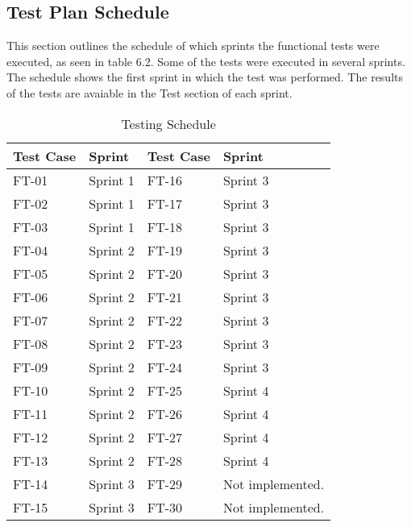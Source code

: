 \subsection*{Test Plan Schedule}

This section outlines the schedule of which sprints the functional tests were executed, as seen in table 6.2. Some of the tests were executed in several sprints. The schedule shows the first sprint in which the test was performed. The results of the tests are avaiable in the Test section of each sprint.


\begin{table}[h]
\centering
\begin{tabular}{| l | l || l | l |}
	\rowcolor{lightgray}
	\hline
	{\bf Test Case} & {\bf Sprint} & {\bf Test Case} & {\bf Sprint} \\ \hline
	FT-01 & Sprint 1 & FT-16 & Sprint 3 \\ \hline
	FT-02 & Sprint 1 & FT-17 & Sprint 3 \\ \hline
	FT-03 & Sprint 1 & FT-18 & Sprint 3 \\ \hline
	FT-04 & Sprint 2 & FT-19 & Sprint 3	\\ \hline
	FT-05 & Sprint 2 & FT-20 & Sprint 3 \\ \hline
	FT-06 & Sprint 2 & FT-21 & Sprint 3 \\ \hline
	FT-07 & Sprint 2 & FT-22 & Sprint 3	\\ \hline
	FT-08 & Sprint 2 & FT-23 & Sprint 3 \\ \hline
	FT-09 & Sprint 2 & FT-24 & Sprint 3 \\ \hline
	FT-10 & Sprint 2 & FT-25 & Sprint 4 \\ \hline
	FT-11 & Sprint 2 & FT-26 & Sprint 4 \\ \hline
	FT-12 & Sprint 2 & FT-27 & Sprint 4 \\ \hline 
	FT-13 & Sprint 2 & FT-28 & Sprint 4 \\ \hline
	FT-14 & Sprint 3 & FT-29 & Not implemented. \\ \hline
	FT-15 & Sprint 3 & FT-30 & Not implemented. \\ \hline
\end{tabular}
\caption{Testing Schedule}
\end{table}